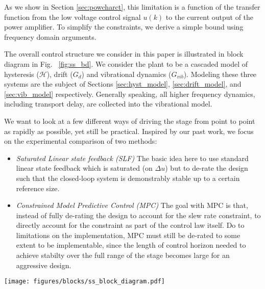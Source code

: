 \documentclass[journal,twocolumn,twoside]{IEEEtran}
\begin{document}
As we show in Section \ref{sec:powcharct}, this limitation is a function of the transfer function from the low voltage control signal $u(k)$ to the current output of the power amplifier. To simplify the constraints, we derive a simple bound using frequency domain arguments.

The overall control structure we consider in this paper is illustrated in block diagram in Fig. ~\ref{fig:ss_bd}. We consider the plant to be a cascaded model of hysteresis ($\mathcal{H}$),  drift ($G_d$) and vibrational dynamics ($G_{vib}$). Modeling these three systems are the subject of Sections \ref{sec:hyst_model}, \ref{sec:drift_model}, and \ref{sec:vib_model} respectively. Generally speaking, all higher frequency dynamics, including transport delay, are collected into the vibrational model.




We want to look at a few different ways of driving the stage from point to point as rapidly as possible, yet still be practical. Inspired by our past work, we focus on the experimental comparison of two methods:
\begin{itemize}
\item\emph{Saturated Linear state feedback (SLF)} The basic idea here to use standard linear state feedback which is saturated (on $\Delta u$) but to de-rate the design such that the closed-loop system is demonstrably stable up to a certain reference size. 
\item\emph{Constrained Model Predictive Control (MPC)} The goal with MPC is that, instead of fully de-rating the design to account for the slew rate constraint, to directly account for the constraint as part of the control law itself. Do to limitations on the implementation, MPC must still be de-rated to some extent to be implementable, since the length of control horizon needed to achieve stabilty over the full range of the stage becomes large for an aggressive design.
\end{itemize}


\begin{figure*}
  \centering  
  \texttt{[image: figures/blocks/ss\_block\_diagram.pdf]}
  \caption{The overall plant model consists of a vibrational component, $G_{vib}$, a drift model $G_{d}$ and a hysteresis model $\mathcal{H}[\cdot]$. }
  \label{fig:ss_bd}
\end{figure*}
\end{document}
